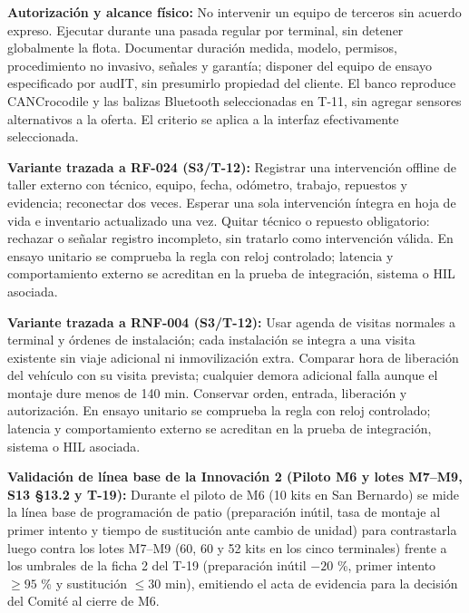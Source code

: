 \par\noindent\textbf{Autorización y alcance físico:} No intervenir un equipo de terceros sin acuerdo expreso. Ejecutar durante una pasada regular por terminal, sin detener globalmente la flota. Documentar duración medida, modelo, permisos, procedimiento no invasivo, señales y garantía; disponer del equipo de ensayo especificado por audIT, sin presumirlo propiedad del cliente. El banco reproduce CANCrocodile y las balizas Bluetooth seleccionadas en T-11, sin agregar sensores alternativos a la oferta. El criterio se aplica a la interfaz efectivamente seleccionada.\par

\par\noindent\textbf{Variante trazada a RF-024 (S3/T-12):} Registrar una intervención offline de taller externo con técnico, equipo, fecha, odómetro, trabajo, repuestos y evidencia; reconectar dos veces. Esperar una sola intervención íntegra en hoja de vida e inventario actualizado una vez. Quitar técnico o repuesto obligatorio: rechazar o señalar registro incompleto, sin tratarlo como intervención válida. En ensayo unitario se comprueba la regla con reloj controlado; latencia y comportamiento externo se acreditan en la prueba de integración, sistema o HIL asociada.\par

\par\noindent\textbf{Variante trazada a RNF-004 (S3/T-12):} Usar agenda de visitas normales a terminal y órdenes de instalación; cada instalación se integra a una visita existente sin viaje adicional ni inmovilización extra. Comparar hora de liberación del vehículo con su visita prevista; cualquier demora adicional falla aunque el montaje dure menos de 140 min. Conservar orden, entrada, liberación y autorización. En ensayo unitario se comprueba la regla con reloj controlado; latencia y comportamiento externo se acreditan en la prueba de integración, sistema o HIL asociada.\par

\par\noindent\textbf{Validación de línea base de la Innovación 2 (Piloto M6 y lotes M7--M9, S13 §13.2 y T-19):} Durante el piloto de M6 (10 kits en San Bernardo) se mide la línea base de programación de patio (preparación inútil, tasa de montaje al primer intento y tiempo de sustitución ante cambio de unidad) para contrastarla luego contra los lotes M7--M9 (60, 60 y 52 kits en los cinco terminales) frente a los umbrales de la ficha 2 del T-19 (preparación inútil $-20$ \%, primer intento $\ge 95$ \% y sustitución $\le 30\text{ min}$), emitiendo el acta de evidencia para la decisión del Comité al cierre de M6.\par


